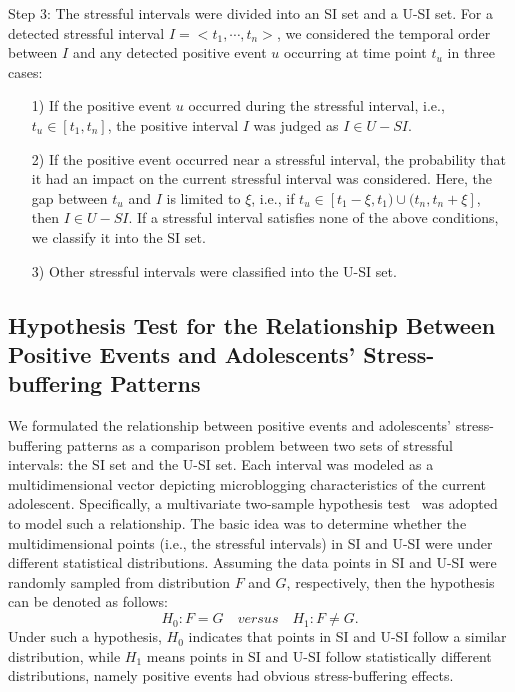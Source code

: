 Step 3: The stressful intervals were divided  into an SI set and a U-SI set.
For a detected stressful interval $I = <t_1,\cdots,t_n>$,
we considered the temporal order between $I$ and any detected positive event $u$ occurring at time point $t_u$ in three cases:
\begin{itemize}
\item[1)] If the positive event $u$ occurred during the stressful interval, i.e., $t_u \in [t_1,t_n]$,
the positive interval $I$ was judged as $I \in U-SI$.
\vspace{-0.3cm}
\item[2)] If the positive event occurred near a stressful interval,
the probability that it had an impact on the current stressful interval was considered.
Here, the gap between $t_u$ and $I$ is limited to $\xi$, i.e.,
if $t_u \in [t_{1}-\xi, t_1)\cup(t_{n},t_{n}+\xi]$, then $I \in U-SI$.
If a stressful interval satisfies none of the above conditions, we classify it into the SI set.
\vspace{-0.3cm}
\item[3)] Other stressful intervals were classified into the U-SI set.
\end{itemize}

\subsection{Hypothesis Test for the Relationship Between Positive Events and Adolescents' Stress-buffering Patterns}
\label{sec:frame2}
We formulated the relationship between positive events and adolescents' stress-buffering patterns
as a comparison problem between two sets of stressful intervals: the SI set and the U-SI set.
Each interval was modeled as a multidimensional vector depicting microblogging characteristics of the current adolescent.
Specifically, a multivariate two-sample hypothesis test~\citep{Li2017Correlating,Johnson2012Applied} was adopted to model such a relationship.
The basic idea was to determine whether the multidimensional points (i.e., the stressful intervals)
in SI and U-SI were under different statistical distributions.
Assuming the data points in SI and U-SI were randomly sampled from distribution $F$ and $G$, respectively,
then the hypothesis can be denoted as follows:
\begin{equation}
H_0: F = G \quad versus \quad H_1: F \neq G.
\end{equation}
Under such a hypothesis,
$H_0$ indicates that points in SI and U-SI follow a similar distribution,
while $H_1$ means points in SI and U-SI follow statistically different distributions,
namely positive events had obvious stress-buffering effects.

